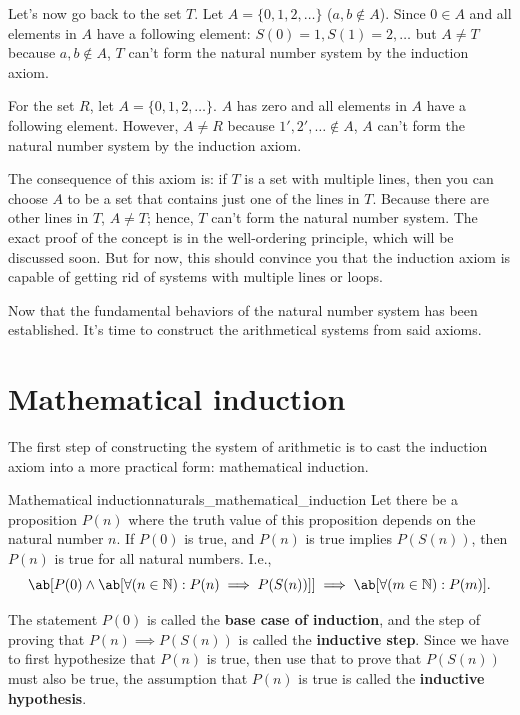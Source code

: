 Let's now go back to the set \(T\). Let \(A = \{0, 1, 2, \dots\}\) (\(a, b \not \in A\)). Since
\(0 \in A\) and all elements in \(A\) have a following element: \(S(0) = 1, S(1) = 2, \dots\) but
\(A \neq T\) because \(a, b \not \in A\), \(T\) can't form the natural number system by the
induction axiom.

For the set \(R\), let \(A = \{0, 1, 2, \dots\}\). \(A\) has zero and all elements in \(A\) have a
following element. However, \(A \neq R\) because \(1', 2', \dots \not \in A\), \(A\) can't form the
natural number system by the induction axiom.

The consequence of this axiom is: if \(T\) is a set with multiple lines, then you can choose \(A\)
to be a set that contains just one of the lines in \(T\). Because there are other lines in \(T\),
\(A \neq T\); hence, \(T\) can't form the natural number system. The exact proof of the concept is
in the well-ordering principle, which will be discussed soon. But for now, this should convince you
that the induction axiom is capable of getting rid of systems with multiple lines or loops.

Now that the fundamental behaviors of the natural number system has been established. It's time to
construct the arithmetical systems from said axioms.

\section{Mathematical induction}

The first step of constructing the system of arithmetic is to cast the induction axiom into a more
practical form: mathematical induction.

\begin{theorem}{Mathematical induction}{naturals_mathematical_induction}
   
  Let there be a proposition \(P(n)\) where the truth value of this proposition depends on the
  natural number \(n\). If \(P(0)\) is true, and \(P(n)\) is true implies \(P(S(n))\), then \(P(n)\)
  is true for all natural numbers. I.e.,
  \begin{equation*}
    \ab[P(0) \land \ab[\forall(n \in \mathbb{N}) : P(n) \implies P(S(n))]] \implies \ab[\forall(m \in \mathbb{N}) : P(m)].
  \end{equation*}
\end{theorem}

The statement \(P(0)\) is called the \textbf{base case of induction}, and the step of proving that
\(P(n) \implies P(S(n))\) is called the \textbf{inductive step}. Since we have to first hypothesize
that \(P(n)\) is true, then use that to prove that \(P(S(n))\) must also be true, the assumption
that \(P(n)\) is true is called the \textbf{inductive hypothesis}.

